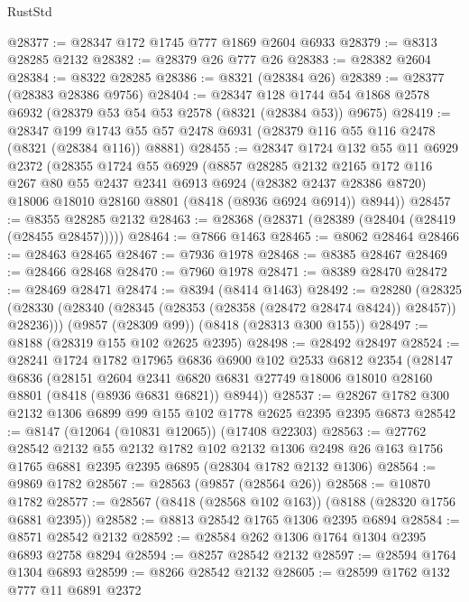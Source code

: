 \begin{lexlean}{RustStd}
\begin{coremodule}
@28377 := @28347 @172 @1745 @777 @1869 @2604 @6933
@28379 := @8313 @28285 @2132
@28382 := @28379 @26 @777 @26
@28383 := @28382 @2604
@28384 := @8322 @28285
@28386 := @8321 (@28384 @26)
@28389 := @28377 (@28383 @28386 @9756)
@28404 := @28347
    @128
    @1744
    @54
    @1868
    @2578
    @6932
    (@28379 @53 @54 @53 @2578 (@8321 (@28384 @53)) @9675)
@28419 := @28347
    @199
    @1743
    @55
    @57
    @2478
    @6931
    (@28379 @116 @55 @116 @2478 (@8321 (@28384 @116)) @8881)
@28455 := @28347
    @1724
    @132
    @55
    @11
    @6929
    @2372
    (@28355
      @1724
      @55
      @6929
      (@8857
        @28285
        @2132
        @2165
        @172
        @116
        @267
        @80
        @55
        @2437
        @2341
        @6913
        @6924
        (@28382 @2437 @28386 @8720)
        @18006
        @18010
        @28160
        @8801
        (@8418 (@8936 @6924 @6914))
        @8944))
@28457 := @8355 @28285 @2132
@28463 := @28368 (@28371 (@28389 (@28404 (@28419 (@28455 @28457)))))
@28464 := @7866 @1463
@28465 := @8062 @28464
@28466 := @28463 @28465
@28467 := @7936 @1978
@28468 := @8385 @28467
@28469 := @28466 @28468
@28470 := @7960 @1978
@28471 := @8389 @28470
@28472 := @28469 @28471
@28474 := @8394 (@8414 @1463)
@28492 := @28280
    (@28325 (@28330 (@28340 (@28345 (@28353 (@28358 (@28472 @28474 @8424)) @28457)) @28236)))
    (@9857 (@28309 @99))
    (@8418 (@28313 @300 @155))
@28497 := @8188 (@28319 @155 @102 @2625 @2395)
@28498 := @28492 @28497
@28524 := @28241
    @1724
    @1782
    @17965
    @6836
    @6900
    @102
    @2533
    @6812
    @2354
    (@28147
      @6836
      (@28151
        @2604
        @2341
        @6820
        @6831
        @27749
        @18006
        @18010
        @28160
        @8801
        (@8418 (@8936 @6831 @6821))
        @8944))
@28537 := @28267 @1782 @300 @2132 @1306 @6899 @99 @155 @102 @1778 @2625 @2395 @2395 @6873
@28542 := @8147 (@12064 (@10831 @12065)) (@17408 @22303)
@28563 := @27762
    @28542
    @2132
    @55
    @2132
    @1782
    @102
    @2132
    @1306
    @2498
    @26
    @163
    @1756
    @1765
    @6881
    @2395
    @2395
    @6895
    (@28304 @1782 @2132 @1306)
@28564 := @9869 @1782
@28567 := @28563 (@9857 (@28564 @26))
@28568 := @10870 @1782
@28577 := @28567 (@8418 (@28568 @102 @163)) (@8188 (@28320 @1756 @6881 @2395))
@28582 := @8813 @28542 @1765 @1306 @2395 @6894
@28584 := @8571 @28542 @2132
@28592 := @28584 @262 @1306 @1764 @1304 @2395 @6893 @2758 @8294
@28594 := @8257 @28542 @2132
@28597 := @28594 @1764 @1304 @6893
@28599 := @8266 @28542 @2132
@28605 := @28599 @1762 @132 @777 @11 @6891 @2372

\end{coremodule}
\end{lexlean}
